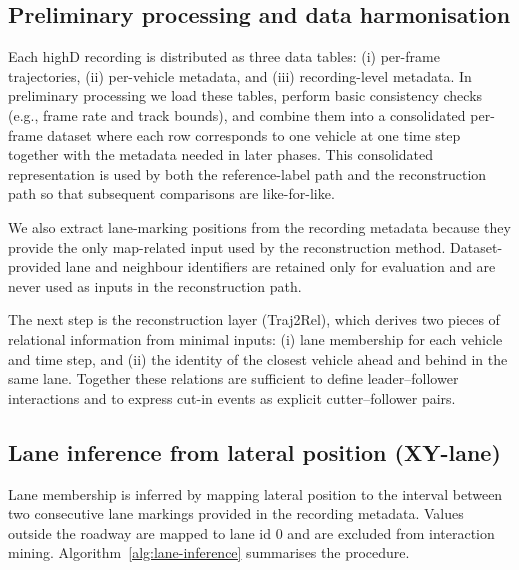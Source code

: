 \documentclass[12pt,a4paper,twoside,openright]{report}
\begin{document}
    \subsection{Preliminary processing and data harmonisation}
    Each highD recording is distributed as three data tables: (i) per-frame trajectories, (ii) per-vehicle metadata, and (iii) recording-level metadata. In preliminary processing we load these tables, perform basic consistency checks (e.g., frame rate and track bounds), and combine them into a consolidated per-frame dataset where each row corresponds to one vehicle at one time step together with the metadata needed in later phases. This consolidated representation is used by both the reference-label path and the reconstruction path so that subsequent comparisons are like-for-like.

    We also extract lane-marking positions from the recording metadata because they provide the only map-related input used by the reconstruction method. Dataset-provided lane and neighbour identifiers are retained only for evaluation and are never used as inputs in the reconstruction path.

    The next step is the reconstruction layer (Traj2Rel), which derives two pieces of relational information from minimal inputs: (i) lane membership for each vehicle and time step, and (ii) the identity of the closest vehicle ahead and behind in the same lane. Together these relations are sufficient to define leader--follower interactions and to express cut-in events as explicit cutter--follower pairs.

    \subsection{Lane inference from lateral position (XY-lane)}
    Lane membership is inferred by mapping lateral position to the interval between two consecutive lane markings provided in the recording metadata. Values outside the roadway are mapped to lane id 0 and are excluded from interaction mining. Algorithm~\ref{alg:lane-inference} summarises the procedure.

    \begin{algorithm}[H]
\caption{Lane inference from lateral position and lane markings}
\label{alg:lane-inference}

\ForEach{frame $t$}{
    \If{$y(t) \notin [b_0, b_K)$}{
        $\ell(t) \leftarrow 0$\tcp*{outside valid lanes}
    }
    \Else{
        find $k$ such that $b_{k-1} \le y(t) < b_k$\;
        $\ell(t) \leftarrow k$\;
    }
}
    \end{algorithm}
\end{document}
